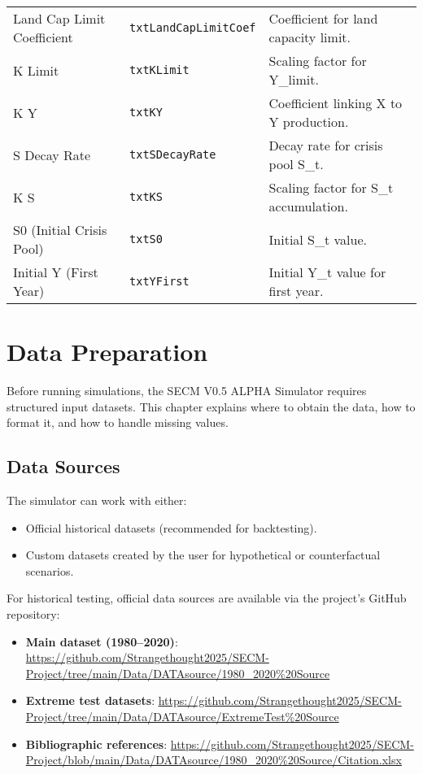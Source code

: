 \documentclass[12pt,a4paper]{article}
\begin{document}
\begin{longtable}{p{4cm} p{4cm} p{7cm}}
Land Cap Limit Coefficient & \texttt{txtLandCapLimitCoef} & Coefficient for land capacity limit. \\
K Limit & \texttt{txtKLimit} & Scaling factor for Y\_limit. \\
K Y & \texttt{txtKY} & Coefficient linking X to Y production. \\
S Decay Rate & \texttt{txtSDecayRate} & Decay rate for crisis pool S\_t. \\
K S & \texttt{txtKS} & Scaling factor for S\_t accumulation. \\
S0 (Initial Crisis Pool) & \texttt{txtS0} & Initial S\_t value. \\
Initial Y (First Year) & \texttt{txtYFirst} & Initial Y\_t value for first year. \\
\bottomrule
\end{longtable}

\newpage
\section{Data Preparation}

Before running simulations, the SECM V0.5 ALPHA Simulator requires structured input datasets.  
This chapter explains where to obtain the data, how to format it, and how to handle missing values.

\subsection{Data Sources}
The simulator can work with either:
\begin{itemize}
    \item Official historical datasets (recommended for backtesting).
    \item Custom datasets created by the user for hypothetical or counterfactual scenarios.
\end{itemize}

For historical testing, official data sources are available via the project’s GitHub repository:

\begin{itemize}
    \item \textbf{Main dataset (1980–2020)}: \url{https://github.com/Strangethought2025/SECM-Project/tree/main/Data/DATAsource/1980_2020%20Source}
    \item \textbf{Extreme test datasets}: \url{https://github.com/Strangethought2025/SECM-Project/tree/main/Data/DATAsource/ExtremeTest%20Source}
    \item \textbf{Bibliographic references}: \url{https://github.com/Strangethought2025/SECM-Project/blob/main/Data/DATAsource/1980_2020%20Source/Citation.xlsx}
\end{itemize}
\end{document}
